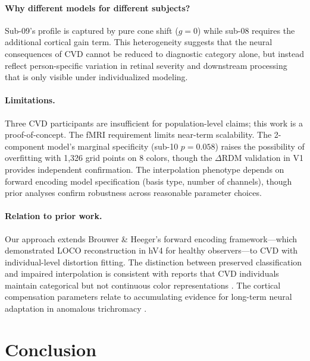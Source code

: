 \documentclass{article}
\begin{document}
\paragraph{Why different models for different subjects?}
Sub-09's profile is captured by pure cone shift ($g = 0$) while sub-08 requires the additional cortical gain term.
This heterogeneity suggests that the neural consequences of CVD cannot be reduced to diagnostic category alone, but instead reflect person-specific variation in retinal severity and downstream processing that is only visible under individualized modeling.

\paragraph{Limitations.}
Three CVD participants are insufficient for population-level claims; this work is a proof-of-concept.
The fMRI requirement limits near-term scalability.
The 2-component model's marginal specificity (sub-10 $p = 0.058$) raises the possibility of overfitting with 1,326 grid points on 8 colors, though the $\Delta$RDM validation in V1 provides independent confirmation.
The interpolation phenotype depends on forward encoding model specification (basis type, number of channels), though prior analyses confirm robustness across reasonable parameter choices.

\paragraph{Relation to prior work.}
Our approach extends Brouwer \& Heeger's \cite{placeholder_brouwer2009} forward encoding framework---which demonstrated LOCO reconstruction in hV4 for healthy observers---to CVD with individual-level distortion fitting.
The distinction between preserved classification and impaired interpolation is consistent with reports that CVD individuals maintain categorical but not continuous color representations \cite{placeholder_bannert2018}.
The cortical compensation parameters relate to accumulating evidence for long-term neural adaptation in anomalous trichromacy \cite{placeholder_tregillus2021, placeholder_emery2021}.

\section{Conclusion}
\label{sec:conclusion}
\end{document}
